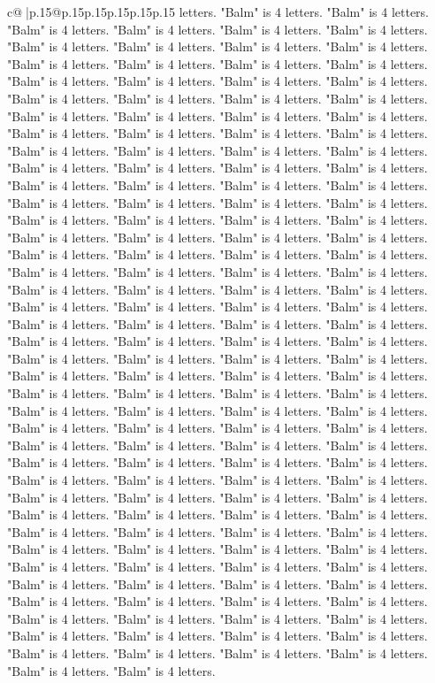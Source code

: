 \documentclass{article}
\begin{document}
{\begin{supertabular}{c@{$\;$}|p{.15\linewidth}@{}p{.15\linewidth}p{.15\linewidth}p{.15\linewidth}p{.15\linewidth}p{.15\linewidth}}
{{{letters. "Balm" is 4 letters. "Balm" is 4 letters. "Balm" is 4 letters. "Balm" is 4 letters. "Balm" is 4 letters. "Balm" is 4 letters. "Balm" is 4 letters. "Balm" is 4 letters. "Balm" is 4 letters. "Balm" is 4 letters. "Balm" is 4 letters. "Balm" is 4 letters. "Balm" is 4 letters. "Balm" is 4 letters. "Balm" is 4 letters. "Balm" is 4 letters. "Balm" is 4 letters. "Balm" is 4 letters. "Balm" is 4 letters. "Balm" is 4 letters. "Balm" is 4 letters. "Balm" is 4 letters. "Balm" is 4 letters. "Balm" is 4 letters. "Balm" is 4 letters. "Balm" is 4 letters. "Balm" is 4 letters. "Balm" is 4 letters. "Balm" is 4 letters. "Balm" is 4 letters. "Balm" is 4 letters. "Balm" is 4 letters. "Balm" is 4 letters. "Balm" is 4 letters. "Balm" is 4 letters. "Balm" is 4 letters. "Balm" is 4 letters. "Balm" is 4 letters. "Balm" is 4 letters. "Balm" is 4 letters. "Balm" is 4 letters. "Balm" is 4 letters. "Balm" is 4 letters. "Balm" is 4 letters. "Balm" is 4 letters. "Balm" is 4 letters. "Balm" is 4 letters. "Balm" is 4 letters. "Balm" is 4 letters. "Balm" is 4 letters. "Balm" is 4 letters. "Balm" is 4 letters. "Balm" is 4 letters. "Balm" is 4 letters. "Balm" is 4 letters. "Balm" is 4 letters. "Balm" is 4 letters. "Balm" is 4 letters. "Balm" is 4 letters. "Balm" is 4 letters. "Balm" is 4 letters. "Balm" is 4 letters. "Balm" is 4 letters. "Balm" is 4 letters. "Balm" is 4 letters. "Balm" is 4 letters. "Balm" is 4 letters. "Balm" is 4 letters. "Balm" is 4 letters. "Balm" is 4 letters. "Balm" is 4 letters. "Balm" is 4 letters. "Balm" is 4 letters. "Balm" is 4 letters. "Balm" is 4 letters. "Balm" is 4 letters. "Balm" is 4 letters. "Balm" is 4 letters. "Balm" is 4 letters. "Balm" is 4 letters. "Balm" is 4 letters. "Balm" is 4 letters. "Balm" is 4 letters. "Balm" is 4 letters. "Balm" is 4 letters. "Balm" is 4 letters. "Balm" is 4 letters. "Balm" is 4 letters. "Balm" is 4 letters. "Balm" is 4 letters. "Balm" is 4 letters. "Balm" is 4 letters. "Balm" is 4 letters. "Balm" is 4 letters. "Balm" is 4 letters. "Balm" is 4 letters. "Balm" is 4 letters. "Balm" is 4 letters. "Balm" is 4 letters. "Balm" is 4 letters. "Balm" is 4 letters. "Balm" is 4 letters. "Balm" is 4 letters. "Balm" is 4 letters. "Balm" is 4 letters. "Balm" is 4 letters. "Balm" is 4 letters. "Balm" is 4 letters. "Balm" is 4 letters. "Balm" is 4 letters. "Balm" is 4 letters. "Balm" is 4 letters. "Balm" is 4 letters. "Balm" is 4 letters. "Balm" is 4 letters. "Balm" is 4 letters. "Balm" is 4 letters. "Balm" is 4 letters. "Balm" is 4 letters. "Balm" is 4 letters. "Balm" is 4 letters. "Balm" is 4 letters. "Balm" is 4 letters. "Balm" is 4 letters. "Balm" is 4 letters. "Balm" is 4 letters. "Balm" is 4 letters. "Balm" is 4 letters. "Balm" is 4 letters. "Balm" is 4 letters. "Balm" is 4 letters. "Balm" is 4 letters. "Balm" is 4 letters. "Balm" is 4 letters. "Balm" is 4 letters. "Balm" is 4 letters. "Balm" is 4 letters. "Balm" is 4 letters. "Balm" is 4 letters. "Balm" is 4 letters. "Balm" is 4 letters. "Balm" is 4 letters. "Balm" is 4 letters. "Balm" is 4 letters. "Balm" is 4 letters. "Balm" is 4 letters. "Balm" is 4 letters. "Balm" is 4 letters. "Balm" is 4 letters. "Balm" is 4 letters. "Balm" is 4 letters. "Balm" is 4 letters. }}}
\end{supertabular}}
\end{document}
